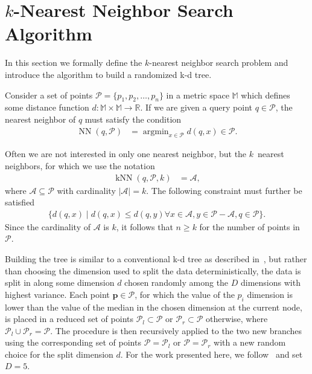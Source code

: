 \section{$k$-Nearest Neighbor Search Algorithm}
  \label{sec:background}

  In this section we formally define the $k$-nearest neighbor search problem 
  and introduce the algorithm to build a randomized k-d tree.

   Consider a set of points $\mathcal{P} 
  = \{p_1,p_2,\dots,p_n\}$ in a metric space $\mathbb{M}$ which defines some 
  distance function $d\colon\mathbb{M}\times\mathbb{M}\to\mathbb{R}$.  If we 
  are given a query point $q\in\mathcal{P}$, the nearest neighbor of $q$ must 
  satisfy the condition
  \begin{align}
    \label{eq:NN}
    \operatorname{NN}(q,\mathcal{P}) &= \operatorname{argmin}_{x\in\mathcal{P}} 
    d(q,x)\in\mathcal{P}.
  \end{align}

  Often we are not interested in only one nearest neighbor, but the $k$~nearest 
  neighbors, for which we use the notation
  \begin{align}
    \label{eq:kNN}
    \operatorname{kNN}(q,\mathcal{P},k) &= \mathcal{A},
  \end{align}
  where $\mathcal{A}\subseteq\mathcal{P}$ with cardinality 
  $\vert\mathcal{A}\vert = k$.  The following constraint must further be 
  satisfied
  \begin{align}
    \label{eq:constraint_kNN}
    \{d(q,x)\mid d(q,x)\leq d(q,y)\forall x\in\mathcal{A}, 
    y\in\mathcal{P}-\mathcal{A},q\in\mathcal{P}\}.
  \end{align}
  Since the cardinality of $\mathcal{A}$ is $k$, it follows that $n\geq k$ for 
  the number of points in $\mathcal{P}$.

   Building the tree is similar to a conventional 
  k-d tree as described in~\cite{bentley1975a,friedman1977a}, but rather than choosing the dimension used to split the data deterministically, 
  the data is split %
  in along some dimension $d$ chosen randomly among the $D$ dimensions with highest variance. Each point 
  $\pmb{p}\in\mathcal{P}$, for which the value of the $p_i$ dimension is lower than 
  the value of the median in the chosen dimension at the current node, is 
  placed in a reduced set of points $\mathcal{P}_l\subset\mathcal{P}$ or 
  $\mathcal{P}_r\subset\mathcal{P}$ otherwise, where 
  $\mathcal{P}_l\cup\mathcal{P}_r = \mathcal{P}$.
  The procedure is then recursively applied to the two new branches using the 
  corresponding set of points $\mathcal{P}=\mathcal{P}_l$ or 
  $\mathcal{P}=\mathcal{P}_r$ with a new random choice for the split dimension 
  $d$. %
  For the work presented here, we follow~\cite{muja2009a} and set 
  $D=5$.
  
